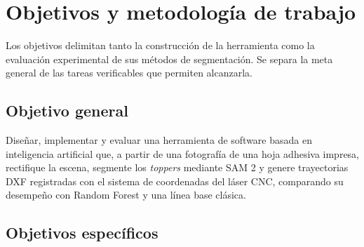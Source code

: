 \chapter{Objetivos y metodología de trabajo}
\label{cap:objetivos}

Los objetivos delimitan tanto la construcción de la herramienta como la evaluación experimental de sus métodos de segmentación. Se separa la meta general de las tareas verificables que permiten alcanzarla.

\section{Objetivo general}

Diseñar, implementar y evaluar una herramienta de software basada en inteligencia artificial que, a partir de una fotografía de una hoja adhesiva impresa, rectifique la escena, segmente los \textit{toppers} mediante SAM 2 y genere trayectorias DXF registradas con el sistema de coordenadas del láser CNC, comparando su desempeño con Random Forest y una línea base clásica.

\section{Objetivos específicos}

